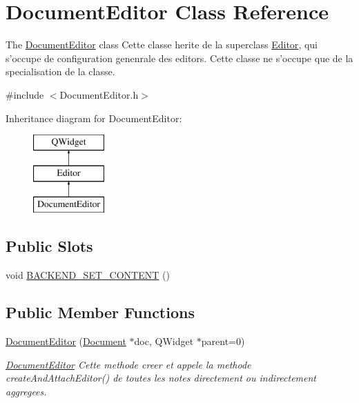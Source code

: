 \hypertarget{class_document_editor}{\section{Document\-Editor Class Reference}
\label{class_document_editor}
}


The \hyperlink{class_document_editor}{Document\-Editor} class Cette classe herite de la superclass \hyperlink{class_editor}{Editor}, qui s'occupe de configuration genenrale des editors. Cette classe ne s'occupe que de la specialisation de la classe.  




{\ttfamily \#include $<$Document\-Editor.\-h$>$}

Inheritance diagram for Document\-Editor\-:\begin{figure}[H]
\begin{center}
\leavevmode
\includegraphics[height=3.000000cm]{class_document_editor}
\end{center}
\end{figure}
\subsection*{Public Slots}
\begin{DoxyCompactItemize}
\item 
void \hyperlink{class_document_editor_adb479ef54919decc602d8929c53ade88}{B\-A\-C\-K\-E\-N\-D\-\_\-\-S\-E\-T\-\_\-\-C\-O\-N\-T\-E\-N\-T} ()
\end{DoxyCompactItemize}
\subsection*{Public Member Functions}
\begin{DoxyCompactItemize}
\item 
\hyperlink{class_document_editor_a510647e1755f017c6150a0241227b898}{Document\-Editor} (\hyperlink{class_document}{Document} $\ast$doc, Q\-Widget $\ast$parent=0)
\begin{DoxyCompactList}\small\item\em \hyperlink{class_document_editor}{Document\-Editor} Cette methode creer et appele la methode create\-And\-Attach\-Editor() de toutes les notes directement ou indirectement aggregees. \end{DoxyCompactList}\end{DoxyCompactItemize}
